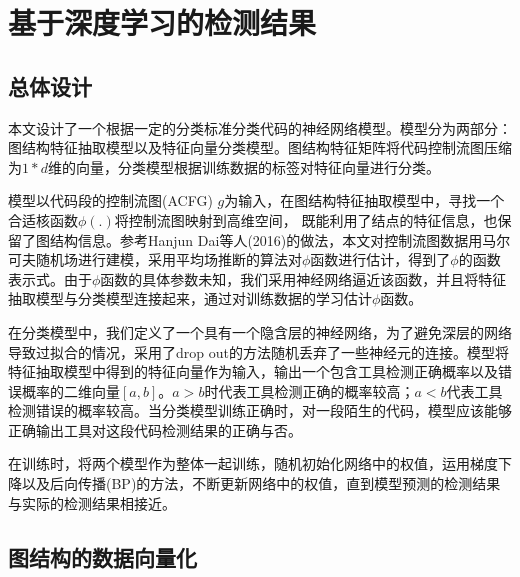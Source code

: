 \chapter{基于深度学习的检测结果}
\section{总体设计}
本文设计了一个根据一定的分类标准分类代码的神经网络模型。模型分为两部分：图结构特征抽取模型以及特征向量分类模型。图结构特征矩阵将代码控制流图压缩为$1*d$维的向量，分类模型根据训练数据的标签对特征向量进行分类。
\par 模型以代码段的控制流图(ACFG) $g$为输入，在图结构特征抽取模型中，寻找一个合适核函数$\phi(.)$将控制流图映射到高维空间， 既能利用了结点的特征信息，也保留了图结构信息。参考Hanjun Dai等人(2016)的做法，本文对控制流图数据用马尔可夫随机场进行建模，采用平均场推断的算法对$\phi$函数进行估计，得到了$\phi$的函数表示式。由于$\phi$函数的具体参数未知，我们采用神经网络逼近该函数，并且将特征抽取模型与分类模型连接起来，通过对训练数据的学习估计$\phi$函数。
\par 在分类模型中，我们定义了一个具有一个隐含层的神经网络，为了避免深层的网络导致过拟合的情况，采用了drop out的方法随机丢弃了一些神经元的连接。模型将特征抽取模型中得到的特征向量作为输入，输出一个包含工具检测正确概率以及错误概率的二维向量$[a, b]$。$a>b$时代表工具检测正确的概率较高；$a<b$代表工具检测错误的概率较高。当分类模型训练正确时，对一段陌生的代码，模型应该能够正确输出工具对这段代码检测结果的正确与否。
\par 在训练时，将两个模型作为整体一起训练，随机初始化网络中的权值，运用梯度下降以及后向传播(BP)的方法，不断更新网络中的权值，直到模型预测的检测结果与实际的检测结果相接近。
\label{chap:deeplearning}
\section{图结构的数据向量化}
